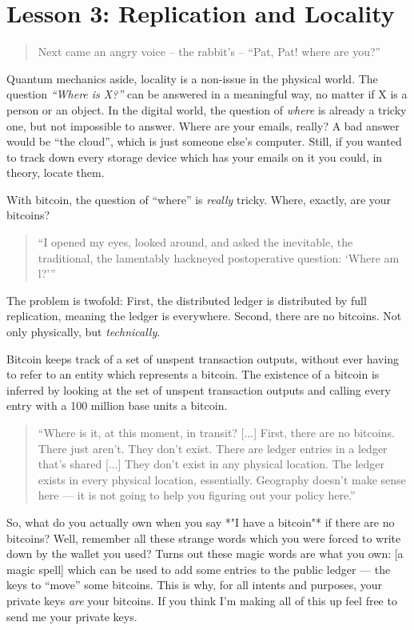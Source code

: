 \chapter{Lesson 3: Replication and Locality}
\label{les:3}

\blockquote{
Next came an angry voice -- the rabbit's -- ``Pat, Pat! where are you?''
}

Quantum mechanics aside, locality is a non-issue in the physical world.
The question \textit{``Where is X?''} can be answered in a meaningful way, no
matter if X is a person or an object. In the digital world, the question
of \textit{where} is already a tricky one, but not impossible to answer. Where
are your emails, really? A bad answer would be ``the cloud'', which is
just someone else's computer. Still, if you wanted to track down every
storage device which has your emails on it you could, in theory, locate
them.

With bitcoin, the question of ``where'' is \textit{really} tricky. Where,
exactly, are your bitcoins?

\begin{quotation}
``I opened my eyes, looked around, and asked the inevitable, the
traditional, the lamentably hackneyed postoperative question: `Where
am l?'''
\end{quotation}

The problem is twofold: First, the distributed ledger is distributed by
full replication, meaning the ledger is everywhere. Second, there are no
bitcoins. Not only physically, but \textit{technically}.

Bitcoin keeps track of a set of unspent transaction outputs, without
ever having to refer to an entity which represents a bitcoin. The
existence of a bitcoin is inferred by looking at the set of unspent
transaction outputs and calling every entry with a 100 million base
units a bitcoin.

\begin{quotation}
``Where is it, at this moment, in transit? [...] First, there are no
bitcoins. There just aren't. They don't exist. There are ledger
entries in a ledger that's shared [...] They don't exist in any
physical location. The ledger exists in every physical location,
essentially. Geography doesn't make sense here --- it is not going to
help you figuring out your policy here.''\cite{wbd049}
\end{quotation}

So, what do you actually own when you say *"I have a bitcoin"* if there
are no bitcoins? Well, remember all these strange words which you were
forced to write down by the wallet you used? Turns out these magic words
are what you own: [a magic spell] which can be used to add some entries
to the public ledger --- the keys to ``move'' some bitcoins. This is why,
for all intents and purposes, your private keys \textit{are} your bitcoins. If
you think I'm making all of this up feel free to send me your private
keys.

